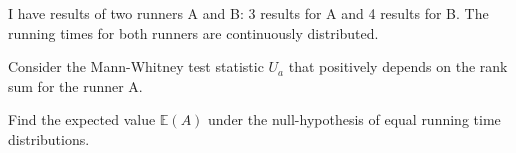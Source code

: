 
\begin{question}
I have results of two runners A and B: 3 results for A and 4 results
for B. The running times for both runners are continuously distributed.

Consider the Mann-Whitney test statistic \(U_a\) that positively depends on the
rank sum for the runner A.

Find the expected value \(\mathbb{E}(A)\) under the null-hypothesis of equal running
time distributions.
\end{question}


